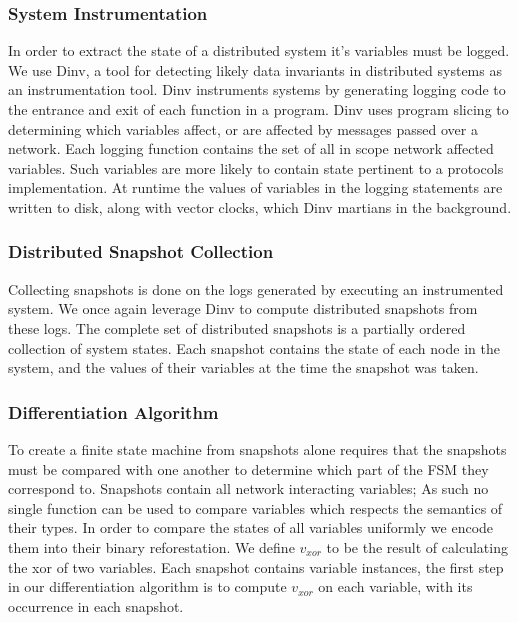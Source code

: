 \subsubsection{System Instrumentation}

In order to extract the state of a distributed system it's variables must be
logged. We use Dinv, a tool for detecting likely data invariants in distributed
systems as an instrumentation tool. Dinv instruments systems by generating
logging code to the entrance and exit of each function in a program. Dinv uses
program slicing to determining which variables affect, or are affected by
messages passed over a network. Each logging function contains the set of all
in scope network affected variables. Such variables are more likely to contain
state pertinent to a protocols implementation. At runtime the values of
variables in the logging statements are written to disk, along with vector
clocks, which Dinv martians in the background.

\subsubsection{Distributed Snapshot Collection}

Collecting snapshots is done on the logs generated by executing an instrumented
system. We once again leverage Dinv to compute distributed snapshots from these
logs. The complete set of distributed snapshots is a partially ordered
collection of system states. Each snapshot contains the state of each node in
the system, and the values of their variables at the time the snapshot was
taken.

\subsubsection{Differentiation Algorithm}

To create a finite state machine from snapshots alone requires that the
snapshots must be compared with one another to determine which part of the FSM
they correspond to. Snapshots contain all network interacting variables; As
such no single function can be used to compare variables which respects the
semantics of their types. In order to compare the states of all variables
uniformly we encode them into their binary reforestation. We define $v_{xor}$ to
be the result of calculating the xor of two variables. Each snapshot contains
variable instances, the first step in our differentiation algorithm is to
compute $v_{xor}$ on each variable, with its occurrence in each snapshot.


